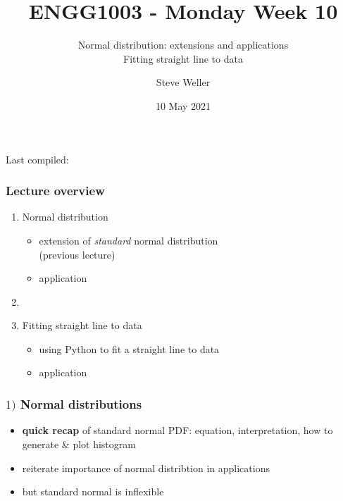 \documentclass[english,14pt]{beamer}
\title{ENGG1003 - Monday Week 10}
\subtitle{Normal distribution: extensions and applications \\ Fitting straight line to data}%
\author{Steve Weller}
\institute{University of Newcastle}
\date{10 May 2021}
\begin{document}
\begin{flushleft}
{\scriptsize Last compiled:~\DTMnow}
\vspace*{-5mm}
\end{flushleft}
\framebreak


\begin{frame}[fragile]

\frametitle{Lecture overview}
\begin{enumerate}
	\item Normal distribution
		\begin{itemize}
			\item extension of \emph{standard} normal distribution \\ (previous lecture)
			\item application
		\end{itemize}	
	\item[]
	
	\item Fitting straight line to data
	\begin{itemize}
		\item using Python to fit a straight line to data
		\item application
	\end{itemize}	
\end{enumerate}

\end{frame}


\begin{frame}[fragile]

\frametitle{$1)$ Normal distributions}

\begin{itemize}
	\item \textbf{quick recap} of standard normal PDF: equation, interpretation, how to generate \& plot histogram
	\item reiterate importance of normal distribtion in applications
	\item but standard normal is inflexible
\end{itemize}

\end{frame}

%
%
%
%
\end{document}
